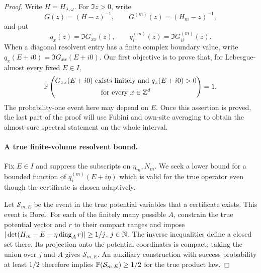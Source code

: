 \begin{proof}
Write $H=H_{\lambda,\omega}$. For $\Im z>0$, write
\[
 G(z)=(H-z)^{-1},\qquad
 G^{(m)}(z)=(H_m-z)^{-1},
\]
and put
\[
 q_x(z)=\Im G_{xx}(z),\qquad
 q_i^{(m)}(z)=\Im G_{ii}^{(m)}(z).
\]
When a diagonal resolvent entry has a finite complex boundary value,
write $q_x(E+i0)=\Im G_{xx}(E+i0)$. Our first objective is to prove
that, for Lebesgue-almost every fixed $E\in I$,
\begin{equation}\label{eq:spectral-all-positive}
 \mathbb P\left(
 \begin{gathered}
 G_{xx}(E+i0)\text{ exists finitely and }q_x(E+i0)>0\\
 \text{for every }x\in\mathbb Z^d
 \end{gathered}
 \right)=1.
\end{equation}
The probability-one event here may depend on $E$. Once this assertion
is proved, the last part of the proof will use Fubini and own-site
averaging to obtain the almost-sure spectral statement on the whole
interval.

\paragraph{A true finite-volume resolvent bound.}
Fix $E\in I$ and suppress the subscripts on $\eta_m,N_m$.
We seek a lower bound for a bounded function of $q_i^{(m)}(E+i\eta)$
which is valid for the true operator even though the certificate is
chosen adaptively.

Let $\mathcal S_{m,E}$ be the event in the true potential variables
that a certificate exists. This event is Borel.
For each of the finitely many possible $A$, constrain the true
potential vector and $r$ to their compact ranges and impose
$|\det(H_m-E-\eta\operatorname{diag}_A r)|\ge1/j$, $j\in\mathbb N$.
The inverse inequalities define a closed set there. Its projection
onto the potential coordinates is compact; taking the union over
$j$ and $A$ gives $\mathcal S_{m,E}$. An auxiliary construction
with success probability at least $1/2$ therefore implies
$\mathbb P(\mathcal S_{m,E})\ge1/2$ for the true product law.


\end{proof}
